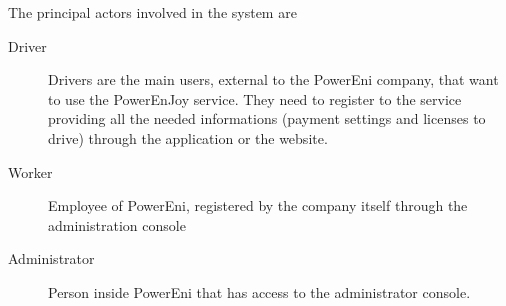 The principal actors involved in the system are
\begin{description}
\item [Driver] Drivers are the main users, external to the PowerEni company, that want to use the PowerEnJoy service. They need to register to the service providing all the needed informations (payment settings and licenses to drive) through the application or the website. 
\item [Worker] Employee of PowerEni, registered by the company itself through the administration console
\item [Administrator] Person inside PowerEni that has access to the administrator console. 
\end{description}